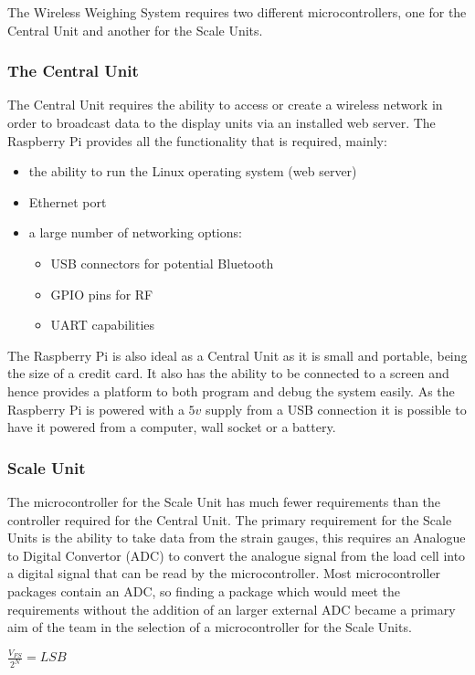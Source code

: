 The Wireless Weighing System requires two different microcontrollers, one for the Central Unit and another for the Scale Units. 
\subsubsection{The Central Unit}
The Central Unit requires the ability to access or create a wireless network in order to broadcast data to the display units via an installed web server. The Raspberry Pi \cite{raspberrypi} provides all the functionality that is required, mainly:
	\begin{itemize}
		\item the ability to run the Linux operating system (web server)
		\item Ethernet port
		\item a large number of networking options:
			\begin{itemize} 
				\item USB connectors for potential Bluetooth
				\item GPIO pins for RF
				\item UART capabilities
			\end{itemize}
	\end{itemize}
The Raspberry Pi is also ideal as a Central Unit as it is small and portable, being the size of a credit card. It also has the ability to be connected to a screen and hence provides a platform to both program and debug the system easily. As the Raspberry Pi is powered with a $5v$ supply from a USB connection it is possible to have it powered from a computer, wall socket or a battery.

\subsubsection{Scale Unit}
The microcontroller for the Scale Unit has much fewer requirements than the controller required for the Central Unit. The primary requirement for the Scale Units is the ability to take data from the strain gauges, this requires an Analogue to Digital Convertor (ADC) to convert the analogue signal from the load cell into a digital signal that can be read by the microcontroller. Most microcontroller packages contain an ADC, so finding a package which would meet the requirements without the addition of an larger external ADC became a primary aim of the team in the selection of a microcontroller for the Scale Units. 

\centerline{\(\frac{V_{FS}}{2^{N}} = LSB  \) \cite{edp2}}
\label{LSBeq}

